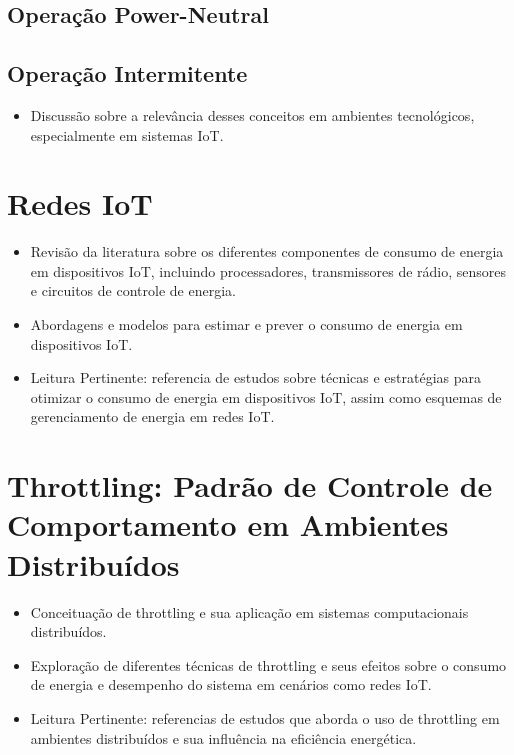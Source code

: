 \subsection{Operação Power-Neutral}
\subsection{Operação Intermitente}



\begin{itemize}
	
	\item Discussão sobre a relevância desses conceitos em ambientes tecnológicos, especialmente em sistemas IoT.
\end{itemize}

\section{Redes IoT}
\label{cap2:iot}
\begin{itemize}
	\item Revisão da literatura sobre os diferentes componentes de consumo de energia em dispositivos IoT, incluindo processadores, transmissores de rádio, sensores e circuitos de controle de energia.
	\item Abordagens e modelos para estimar e prever o consumo de energia em dispositivos IoT.
	\item Leitura Pertinente: referencia de estudos sobre técnicas e estratégias para otimizar o consumo de energia em dispositivos IoT, assim como esquemas de gerenciamento de energia em redes IoT.
\end{itemize}

\section{Throttling: Padrão de Controle de Comportamento em Ambientes Distribuídos}
\label{cap2:throttling}
\begin{itemize}
	\item Conceituação de throttling e sua aplicação em sistemas computacionais distribuídos.
	\item Exploração de diferentes técnicas de throttling e seus efeitos sobre o consumo de energia e desempenho do sistema em cenários como redes IoT.
	\item Leitura Pertinente: referencias de estudos que aborda o uso de throttling em ambientes distribuídos e sua influência na eficiência energética.
\end{itemize}

